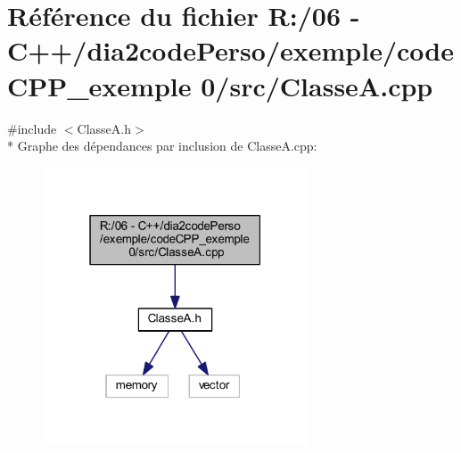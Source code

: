 \section{Référence du fichier R\+:/06 -\/ C++/dia2code\+Perso/exemple/code\+C\+P\+P\+\_\+exemple 0/src/\+Classe\+A.cpp}
\label{_classe_a_8cpp}
{\ttfamily \#include $<$Classe\+A.\+h$>$}\\*
Graphe des dépendances par inclusion de Classe\+A.\+cpp\+:
\nopagebreak
\begin{figure}[H]
\begin{center}
\leavevmode
\includegraphics[width=223pt]{_classe_a_8cpp__incl}
\end{center}
\end{figure}
